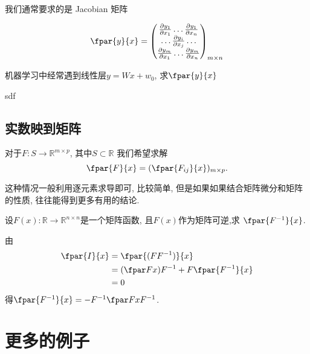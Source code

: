\documentclass{ctexbook}
\begin{document}
我们通常要求的是 Jacobian 矩阵 

\begin{equation*}
  \fpar{y}{x}=
  \begin{pmatrix}
  	\frac{\partial y_1}{\partial x_{1}} \dots \frac{\partial y_1}{\partial x_{n}}\\
  	\dots \frac{\partial y_i}{\partial x_{j}} \dots \\
  	\frac{\partial y_m}{\partial x_{1}} \dots \frac{\partial y_m}{\partial x_{n}}
  \end{pmatrix}_{m\times n}
\end{equation*}

\begin{example}
	机器学习中经常遇到线性层$y = Wx + w_0$, 求$\fpar{y}{x}$
	\begin{solution}
		sdf
	\end{solution}

\end{example}


\section{实数映到矩阵}
对于$F: S\rightarrow \mathbb R^{m\times p}$, 其中$S\subset \mathbb R$ 我们希望求解 $$\fpar{F}{x}= (\fpar{F_{ij}}{x})_{m\times p}.$$

这种情况一般利用逐元素求导即可, 比较简单, 但是如果如果结合矩阵微分和矩阵的性质, 往往能得到更多有用的结论.
\begin{example}
	设$F(x): \mathbb R \rightarrow \mathbb R^{n\times n}$是一个矩阵函数, 且$F(x)$作为矩阵可逆,求 $\fpar{F^{-1}}{x}$.
	\begin{mulsol}
	由
	\begin{align*}
  \fpar{I}{x} &= \fpar{(FF^{-1})}{x} \\
  	&= (\fpar Fx)F^{-1}+ F\fpar{F^{-1}}{x}\\
  	&=0
\end{align*}
得$\fpar{F^{-1}}{x}=-F^{-1}\fpar Fx F^{-1}$.
	\end{mulsol}
\end{example}

\chapter{更多的例子}
\printbibliography
\end{document}

